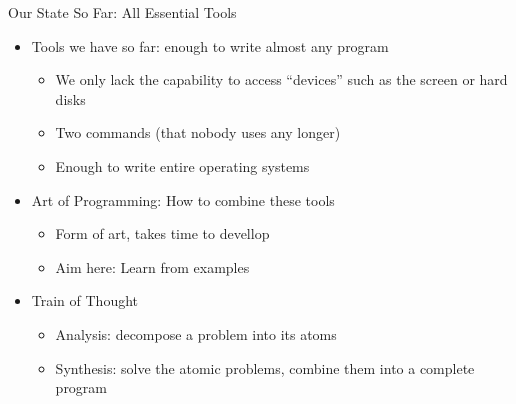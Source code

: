 
\begin{frame}[t,plain]
\titlepage
\end{frame}


\begin{frame}[fragile]{Our State So Far: All Essential Tools}
%
\begin{itemize}
\item Tools we have so far: enough to write almost any program
	\begin{itemize}
	\item We only lack the capability to access \enquote{devices} such as the screen or hard disks
	\item Two commands (that nobody uses any longer)
	\item Enough to write entire operating systems
	\end{itemize}
\item Art of Programming: How to combine these tools
	\begin{itemize}
	\item Form of art, takes time to devellop
	\item Aim here: Learn from examples
	\end{itemize}
\item Train of Thought
	\begin{itemize}
	\item Analysis: decompose a problem into its atoms
	\item Synthesis: solve the atomic problems, combine them into a complete program
	\end{itemize}
\end{itemize}
%
\end{frame}


